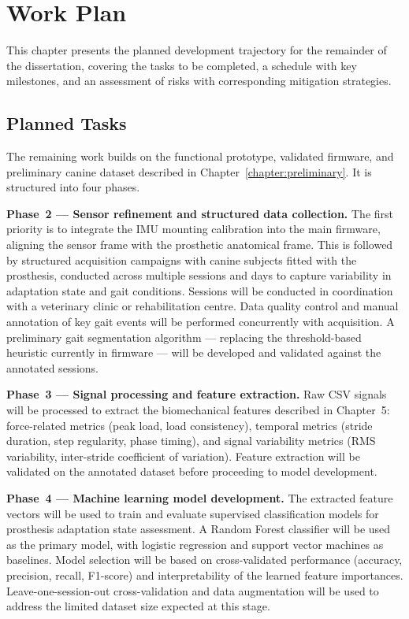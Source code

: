 \chapter{Work Plan}
\label{chapter:workplan}

This chapter presents the planned development trajectory for the remainder of
the dissertation, covering the tasks to be completed, a schedule with key
milestones, and an assessment of risks with corresponding mitigation strategies.

\section{Planned Tasks}
\label{section:tasks}

The remaining work builds on the functional prototype, validated firmware,
and preliminary canine dataset described in Chapter~\ref{chapter:preliminary}.
It is structured into four phases.

\textbf{Phase~2 — Sensor refinement and structured data collection.}
The first priority is to integrate the IMU mounting calibration into the main
firmware, aligning the sensor frame with the prosthetic anatomical frame.
This is followed by structured acquisition campaigns with canine subjects
fitted with the prosthesis, conducted across multiple sessions and days to
capture variability in adaptation state and gait conditions.
Sessions will be conducted in coordination with a veterinary clinic or
rehabilitation centre.
Data quality control and manual annotation of key gait events will be
performed concurrently with acquisition.
A preliminary gait segmentation algorithm — replacing the threshold-based
heuristic currently in firmware — will be developed and validated against
the annotated sessions.

\textbf{Phase~3 — Signal processing and feature extraction.}
Raw CSV signals will be processed to extract the biomechanical features
described in Chapter~5: force-related metrics
(peak load, load consistency), temporal metrics (stride duration, step
regularity, phase timing), and signal variability metrics (RMS variability,
inter-stride coefficient of variation).
Feature extraction will be validated on the annotated dataset before
proceeding to model development.

\textbf{Phase~4 — Machine learning model development.}
The extracted feature vectors will be used to train and evaluate supervised
classification models for prosthesis adaptation state assessment.
A Random Forest classifier will be used as the primary model, with logistic
regression and support vector machines as baselines.
Model selection will be based on cross-validated performance
(accuracy, precision, recall, F1-score) and interpretability of the learned
feature importances.
Leave-one-session-out cross-validation and data augmentation will be used to
address the limited dataset size expected at this stage.


